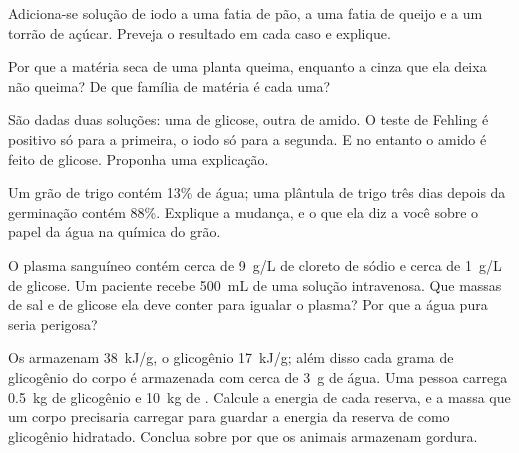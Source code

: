 \begin{exercise}[$\star\star$]\label{exo:g10:chemistry-of-life:9}
Adiciona-se solução de iodo a uma fatia de pão, a uma fatia de queijo e
a um torrão de açúcar. Preveja o resultado em cada caso e explique.
\end{exercise}

\begin{exercise}[$\star\star$]\label{exo:g10:chemistry-of-life:10}
Por que a matéria seca de uma planta queima, enquanto a cinza que ela
deixa não queima? De que família de matéria é cada uma?
\end{exercise}

\begin{exercise}[$\star\star$]\label{exo:g10:chemistry-of-life:11}
São dadas duas soluções: uma de glicose, outra de amido. O teste de
Fehling é positivo só para a primeira, o iodo só para a segunda. E no
entanto o amido é feito de glicose. Proponha uma explicação.
\end{exercise}

\begin{exercise}[$\star\star\star$]\label{exo:g10:chemistry-of-life:12}
Um grão de trigo contém 13\% de água; uma plântula de trigo três dias
depois da germinação contém 88\%. Explique a mudança, e o que ela diz a
você sobre o papel da água na química do grão.
\end{exercise}

\begin{exercise}[$\star\star\star$]\label{exo:g10:chemistry-of-life:13}
O plasma sanguíneo contém cerca de \qty{9}{g/L} de cloreto de sódio e
cerca de \qty{1}{g/L} de glicose. Um paciente recebe \qty{500}{mL} de
uma solução intravenosa. Que massas de sal e de glicose ela deve conter
para igualar o plasma? Por que a água pura seria perigosa?
\end{exercise}

\begin{exercise}[$\star\star\star$]\label{exo:g10:chemistry-of-life:14}
Os  armazenam \qty{38}{kJ/g}, o glicogênio \qty{17}{kJ/g}; além
disso cada grama de glicogênio do corpo é armazenada com cerca de
\qty{3}{g} de água. Uma pessoa carrega \qty{0.5}{kg} de glicogênio e
\qty{10}{kg} de . Calcule a energia de cada reserva, e a massa
que um corpo precisaria carregar para guardar a energia da reserva de
 como glicogênio hidratado. Conclua sobre por que os animais
armazenam gordura.
\end{exercise}

